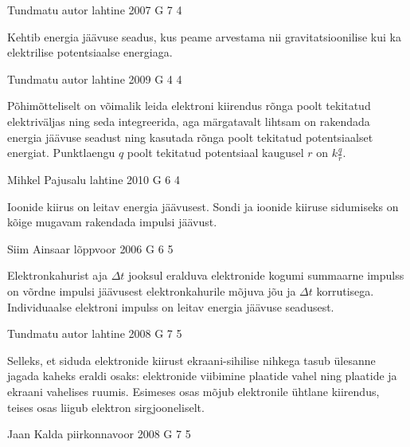 \documentclass[11pt]{article}
\begin{document}
{%
{Tundmatu autor} %
{lahtine} %
{2007} %
{G 7} %
{4} %
{

\ifHint
Kehtib energia jäävuse seadus, kus peame arvestama nii gravitatsioonilise kui ka elektrilise potentsiaalse energiaga.
\fi
}

{Tundmatu autor} %
{lahtine} %
{2009} %
{G 4} %
{4} %
{

\ifHint
Põhimõtteliselt on võimalik leida elektroni kiirendus rõnga poolt tekitatud elektriväljas ning seda integreerida, aga märgatavalt lihtsam on rakendada energia jäävuse seadust ning kasutada rõnga poolt tekitatud potentsiaalset energiat. Punktlaengu $q$ poolt tekitatud potentsiaal kaugusel $r$ on $k\frac{q}{r}$.
\fi
}

{Mihkel Pajusalu} %
{lahtine} %
{2010} %
{G 6} %
{4} %
{

\ifHint
Ioonide kiirus on leitav energia jäävusest. Sondi ja ioonide kiiruse sidumiseks on kõige mugavam rakendada impulsi jäävust.
\fi
}

{Siim Ainsaar} %
{lõppvoor} %
{2006} %
{G 6} %
{5} %
{

\ifHint
Elektronkahurist aja $\Delta t$ jooksul eralduva elektronide kogumi summaarne impulss on võrdne impulsi jäävusest elektronkahurile mõjuva jõu ja $\Delta t$ korrutisega. Individuaalse elektroni impulss on leitav energia jäävuse seadusest.
\fi
}

{Tundmatu autor} %
{lahtine} %
{2008} %
{G 7} %
{5} %
{

\ifHint
Selleks, et siduda elektronide kiirust ekraani-sihilise nihkega tasub ülesanne jagada kaheks eraldi osaks: elektronide viibimine plaatide vahel ning plaatide ja ekraani vahelises ruumis. Esimeses osas mõjub elektronile ühtlane kiirendus, teises osas liigub elektron sirgjooneliselt.
\fi
}

{Jaan Kalda} %
{piirkonnavoor} %
{2008} %
{G 7} %
{5} %
{

}}
\end{document}
